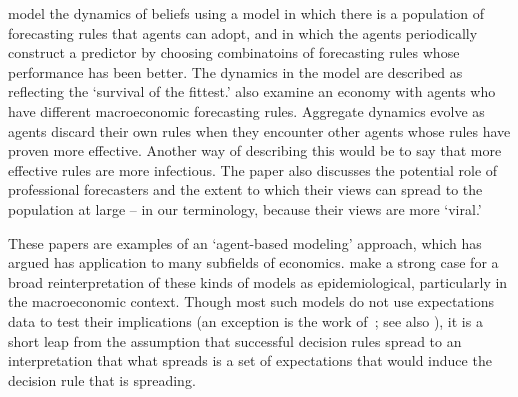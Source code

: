 
\cite{brock1997rational} model the dynamics of beliefs using a model in which there is a population of forecasting rules that agents can adopt, and in which the agents periodically construct a predictor by choosing combinatoins of forecasting rules whose performance has been better.  The dynamics in the model are described as reflecting the `survival of the fittest.' \cite{arifovic2018learning} also examine an economy with agents who have different macroeconomic forecasting rules.  Aggregate dynamics evolve as agents discard their own rules when they encounter other agents whose rules have proven more effective.  Another way of describing this would be to say that more effective rules are more infectious.     The paper also discusses the potential role of professional forecasters and the extent to which their views can spread to the population at large -- in our terminology, because their views are more `viral.'

These papers are examples of an `agent-based modeling' approach, which \cite{tesfatsion2006agent} has argued has application to many subfields of economics.  \cite{haldane_drawing_2019} make a strong case for a broad reinterpretation of these kinds of models as epidemiological, particularly in the macroeconomic context.  Though most such models do not use expectations data to test their implications (an exception is the work of~\cite{hommes2006heterogeneous}; see also \cite{branchHeteroExp}), it is a short leap from the assumption that successful decision rules spread to an interpretation that what spreads is a set of expectations that would induce the decision rule that is spreading.

